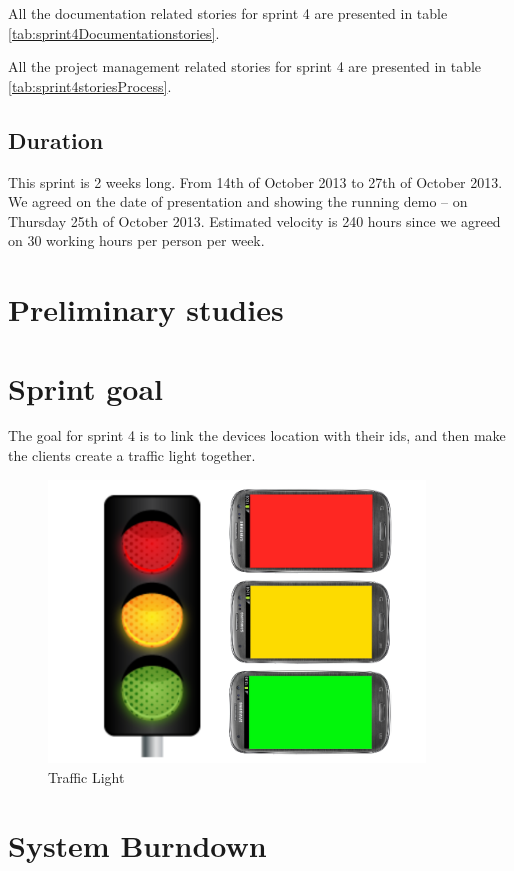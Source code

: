 All the documentation related stories for sprint 4 are presented in table \ref{tab:sprint4Documentationstories}.


All the project management related stories for sprint 4 are presented in table \ref{tab:sprint4storiesProcess}.



\subsection{Duration}
This sprint is 2 weeks long. From 14th of October 2013 to 27th of October 2013. We agreed
on the date of presentation and showing the running demo – on Thursday 25th of October 2013.
Estimated velocity is 240 hours since we agreed on 30 working hours per person per week.

\section{Preliminary studies}
\section{Sprint goal}

The goal for sprint 4 is to link the devices location with their ids, and then make the clients create a traffic light together. 
\begin{figure}[H]
	\centering
		\includegraphics[width=10cm]{sprint4/trafficlight.png}
	\caption{Traffic Light}
	\label{fig:trafficlight}
\end{figure}

\section{System Burndown}

